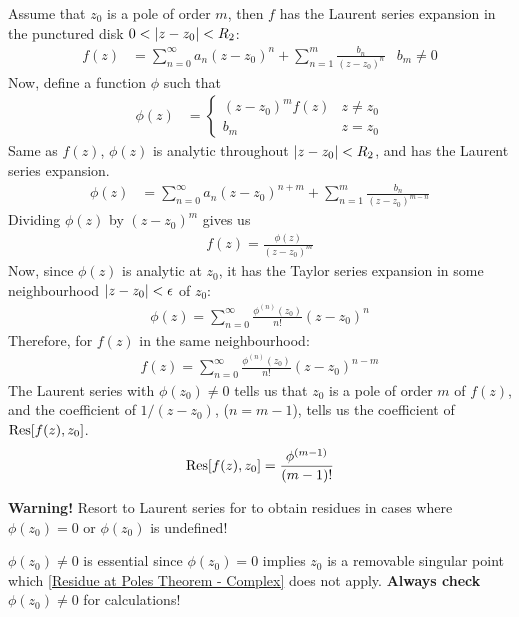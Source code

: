 \documentclass[12pt, english]{book}
\makeatletter
\renewenvironment{proof}[1][\proofname]{\par
	\pushQED{\qed}%
	\normalfont \topsep6\p@\@plus6\p@\relax
	\list{}{%
		\settowidth{\leftmargin}{\itshape\proofname:\hskip\labelsep}%
		\setlength{\labelwidth}{0pt}%
		\setlength{\itemindent}{-\leftmargin}%
	}%
	\item[\hskip\labelsep\itshape#1\@addpunct{:}]\ignorespaces
	}{ \popQED\endlist\@endpefalse}
\makeatother
\begin{document}
	\begin{proof}
		Assume that \(z_0\) is a pole of order \(m\), then \(f\) has the Laurent series expansion in the punctured disk \(0 < \abs{z-z_0} < R_2\):
		\begin{align*}
			f(z) &= \sum_{n=0}^{\infty} a_n (z-z_0)^n + \sum_{n=1}^{m} \frac{b_n}{(z-z_0)^n}
				& b_m \neq 0
		\end{align*}
		Now, define a function \(\phi\) such that 
		\begin{align*}
			\phi(z) &=
			\begin{cases}
				(z-z_0)^m f(z) & z \neq z_0 \\
				b_m				& z=z_0
			\end{cases}
		\end{align*}
		Same as \(f(z)\), \(\phi(z)\) is analytic throughout \(\abs{z-z_0} < R_2\), and has the Laurent series expansion.
		\begin{align*}
			\phi(z) &= \sum_{n=0}^{\infty} a_n (z-z_0)^{n+m} + \sum_{n=1}^{m} \frac{b_n}{(z-z_0)^{m-n}}
		\end{align*}
		Dividing \(\phi(z)\) by \((z-z_0)^m\) gives us 
		\begin{align*}
			f(z) = \frac{\phi(z)}{(z-z_0)^m}
		\end{align*}
		Now, since \(\phi(z)\) is analytic at \(z_0\), it has the Taylor series expansion in some neighbourhood \(\abs{z-z_0}< \epsilon\) of \(z_0\):
		\begin{align*}
			\phi(z) = \sum_{n=0}^{\infty} \frac{\phi^{(n)}(z_0)}{n!} (z-z_0)^n
		\end{align*}
		Therefore, for \(f(z)\) in the same neighbourhood:
		\begin{align*}
			f(z) = \sum_{n=0}^{\infty} \frac{\phi^{(n)}(z_0)}{n!} (z-z_0)^{n-m}
		\end{align*}
		The Laurent series with \(\phi(z_0) \neq 0\) tells us that \(z_0\) is a pole of order \(m\) of \(f(z)\), and the coefficient of \(1/(z-z_0)\), (\(n=m-1\)), tells us the coefficient of \(\Res[f(z),z_0]\).
		\begin{align*}
			\Res[f(z),z_0] = \frac{\phi^{(m-1)}}{(m-1)!}
		\end{align*}
	\end{proof}

	{\color{Red} \textbf{Warning!} Resort to Laurent series for to obtain residues in cases where \(\phi(z_0) = 0\) or \(\phi(z_0)\) is undefined!}

	\(\phi(z_0) \neq 0\) is essential since \(\phi(z_0) = 0\) implies \(z_0\) is a removable singular point which \cref{Residue at Poles Theorem - Complex} does not apply. \textbf{Always check} \(\phi(z_0) \neq 0\) for calculations! 
\end{document}
